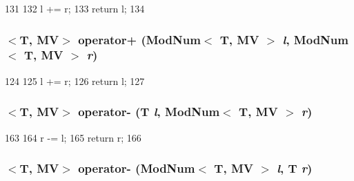 \begin{DoxyCode}
131                                 {
132     l += r;
133     return l;
134 }
\end{DoxyCode}
\hypertarget{mod__num_8hh_af52718572c33bb045de69e9f52117615}{
\subsubsection[{operator+}]{$<$T, MV$>$ operator+ ({\bf ModNum}$<$ T, MV $>$ {\em l}, \/  {\bf ModNum}$<$ T, MV $>$ {\em r})}}
\label{mod__num_8hh_af52718572c33bb045de69e9f52117615}



\begin{DoxyCode}
124                                             {
125     l += r;
126     return l;
127 }
\end{DoxyCode}
\hypertarget{mod__num_8hh_a0808f1add68bf995181f7924eb40906e}{
\subsubsection[{operator-\/}]{$<$T, MV$>$ operator-\/ (T {\em l}, \/  {\bf ModNum}$<$ T, MV $>$ {\em r})}}
\label{mod__num_8hh_a0808f1add68bf995181f7924eb40906e}



\begin{DoxyCode}
163                                 {
164     r -= l;
165     return r;
166 }
\end{DoxyCode}
\hypertarget{mod__num_8hh_a94349bded8b1cad325abd3c73ad41b88}{
\subsubsection[{operator-\/}]{$<$T, MV$>$ operator-\/ ({\bf ModNum}$<$ T, MV $>$ {\em l}, \/  T {\em r})}}
\label{mod__num_8hh_a94349bded8b1cad325abd3c73ad41b88}



